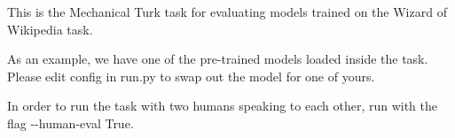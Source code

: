 This is the Mechanical Turk task for evaluating models trained on the Wizard of Wikipedia task.

As an example, we have one of the pre-\/trained models loaded inside the task. Please edit {\ttfamily config} in {\ttfamily run.\+py} to swap out the model for one of yours.

In order to run the task with two humans speaking to each other, run with the flag {\ttfamily -\/-\/human-\/eval True}. 